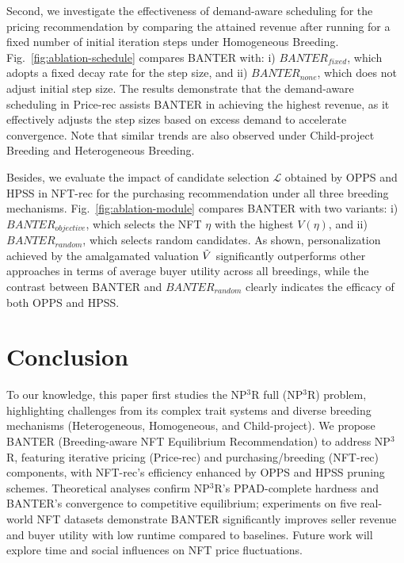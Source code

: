\documentclass[conference]{IEEEtran}
\theoremstyle{plain}
\begin{document}
Second, we investigate the effectiveness of demand-aware scheduling for the pricing recommendation by comparing the attained revenue after running for a fixed number of initial iteration steps under Homogeneous Breeding. Fig.~\ref{fig:ablation-schedule} compares BANTER with: i) $BANTER _{fixed}$, which adopts a fixed decay rate for the step size, and ii) $BANTER _{none}$, which does not adjust initial step size. The results demonstrate that the demand-aware scheduling in Price-rec assists BANTER in achieving the highest revenue, as it effectively adjusts the step sizes based on excess demand to accelerate convergence. Note that similar trends are also observed under Child-project Breeding and Heterogeneous Breeding. 

Besides, we evaluate the impact of candidate selection $\mathcal{L}$ obtained by OPPS and HPSS in NFT-rec for the purchasing recommendation under all three breeding mechanisms. Fig.~\ref{fig:ablation-module} compares BANTER with two variants: i) $BANTER _{objective}$, which selects the NFT $\eta$ with the highest $V(\eta)$, and ii) $BANTER _{random}$, which selects random candidates. As shown, personalization achieved by the amalgamated valuation $\Tilde{V}$ significantly outperforms other approaches in terms of average buyer utility across all breedings, while the contrast between BANTER and $BANTER _{random}$ clearly indicates the efficacy of both OPPS and HPSS.

\section{Conclusion}
To our knowledge, this paper first studies the NP$^3$R full (NP$^3$R) problem, highlighting challenges from its complex trait systems and diverse breeding mechanisms (Heterogeneous, Homogeneous, and Child-project). We propose BANTER (Breeding-aware NFT Equilibrium Recommen\-dation) to address NP$^3$R, featuring iterative pricing (Price-rec) and purchasing/breeding (NFT-rec) components, with NFT-rec's efficiency enhanced by OPPS and HPSS pruning schemes. Theoretical analyses confirm NP$^3$R's PPAD-complete hardness and BANTER's convergence to competitive equilibrium; experiments on five real-world NFT datasets demonstrate BANTER significantly improves seller revenue and buyer utility with low runtime compared to baselines. Future work will explore time and social influences on NFT price fluctuations.




\end{document}
